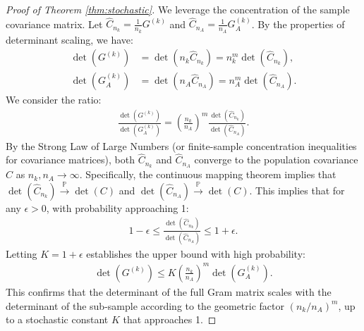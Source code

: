 \documentclass[10pt,a4paper]{amsart}
\begin{document}
\begin{proof}[Proof of Theorem \ref{thm:stochastic}]
We leverage the concentration of the sample covariance matrix. Let $\hat{C}_{n_k} = \frac{1}{n_k} G^{(k)}$ and $\hat{C}_{n_A} = \frac{1}{n_A} G^{(k)}_A$. By the properties of determinant scaling, we have:
\begin{align}
    \det(G^{(k)}) &= \det(n_k \hat{C}_{n_k}) = n_k^m \det(\hat{C}_{n_k}), \nonumber \\
    \det(G^{(k)}_A) &= \det(n_A \hat{C}_{n_A}) = n_A^m \det(\hat{C}_{n_A}).
\end{align}
We consider the ratio:
\begin{align}
    \frac{\det(G^{(k)})}{\det(G^{(k)}_A)} = \left( \frac{n_k}{n_A} \right)^m \frac{\det(\hat{C}_{n_k})}{\det(\hat{C}_{n_A})}.
\end{align}
By the Strong Law of Large Numbers (or finite-sample concentration inequalities for covariance matrices), both $\hat{C}_{n_k}$ and $\hat{C}_{n_A}$ converge to the population covariance $C$ as $n_k, n_A \to \infty$.
Specifically, the continuous mapping theorem implies that $\det(\hat{C}_{n_k}) \xrightarrow{\mathbb{P}} \det(C)$ and $\det(\hat{C}_{n_A}) \xrightarrow{\mathbb{P}} \det(C)$. This implies that for any $\epsilon > 0$, with probability approaching 1:
\begin{align}
    1 - \epsilon \le \frac{\det(\hat{C}_{n_k})}{\det(\hat{C}_{n_A})} \le 1 + \epsilon.
\end{align}
Letting $K = 1+\epsilon$ establishes the upper bound with high probability:
\begin{align}
    \det(G^{(k)}) \le K \left( \frac{n_k}{n_A} \right)^m \det(G^{(k)}_A).
\end{align}
This confirms that the determinant of the full Gram matrix scales with the determinant of the sub-sample according to the geometric factor $(n_k/n_A)^m$, up to a stochastic constant $K$ that approaches 1.
\end{proof}
\end{document}
